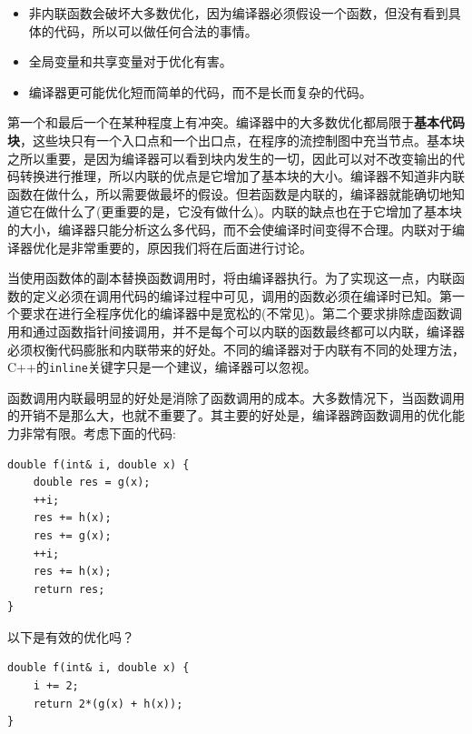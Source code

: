 \begin{itemize}
\item
非内联函数会破坏大多数优化，因为编译器必须假设一个函数，但没有看到具体的代码，所以可以做任何合法的事情。 

\item
全局变量和共享变量对于优化有害。

\item
编译器更可能优化短而简单的代码，而不是长而复杂的代码。
	
\end{itemize}

第一个和最后一个在某种程度上有冲突。编译器中的大多数优化都局限于\textbf{基本代码块}，这些块只有一个入口点和一个出口点，在程序的流控制图中充当节点。基本块之所以重要，是因为编译器可以看到块内发生的一切，因此可以对不改变输出的代码转换进行推理，所以内联的优点是它增加了基本块的大小。编译器不知道非内联函数在做什么，所以需要做最坏的假设。但若函数是内联的，编译器就能确切地知道它在做什么了(更重要的是，它没有做什么)。内联的缺点也在于它增加了基本块的大小，编译器只能分析这么多代码，而不会使编译时间变得不合理。内联对于编译器优化是非常重要的，原因我们将在后面进行讨论。


当使用函数体的副本替换函数调用时，将由编译器执行。为了实现这一点，内联函数的定义必须在调用代码的编译过程中可见，调用的函数必须在编译时已知。第一个要求在进行全程序优化的编译器中是宽松的(不常见)。第二个要求排除虚函数调用和通过函数指针间接调用，并不是每个可以内联的函数最终都可以内联，编译器必须权衡代码膨胀和内联带来的好处。不同的编译器对于内联有不同的处理方法，C++的\texttt{inline}关键字只是一个建议，编译器可以忽视。

函数调用内联最明显的好处是消除了函数调用的成本。大多数情况下，当函数调用的开销不是那么大，也就不重要了。其主要的好处是，编译器跨函数调用的优化能力非常有限。考虑下面的代码:

\begin{lstlisting}[style=styleCXX]
double f(int& i, double x) {
	double res = g(x);
	++i;
	res += h(x);
	res += g(x);
	++i;
	res += h(x);
	return res;
}
\end{lstlisting}

以下是有效的优化吗？

\begin{lstlisting}[style=styleCXX]
double f(int& i, double x) {
	i += 2;
	return 2*(g(x) + h(x));
}
\end{lstlisting}

